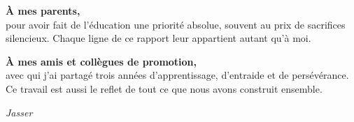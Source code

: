 \vspace{1cm}

\par \textbf{À mes parents,}\\
pour avoir fait de l'éducation une priorité absolue, souvent au prix de sacrifices silencieux. Chaque ligne de ce rapport leur appartient autant qu'à moi.

\vspace{0.6cm}

\par \textbf{À mes amis et collègues de promotion,}\\
avec qui j'ai partagé trois années d'apprentissage, d'entraide et de persévérance. Ce travail est aussi le reflet de tout ce que nous avons construit ensemble.

\vspace{0.6cm}

\vspace{1cm}

\begin{flushright}
\textit{Jasser}
\end{flushright}
